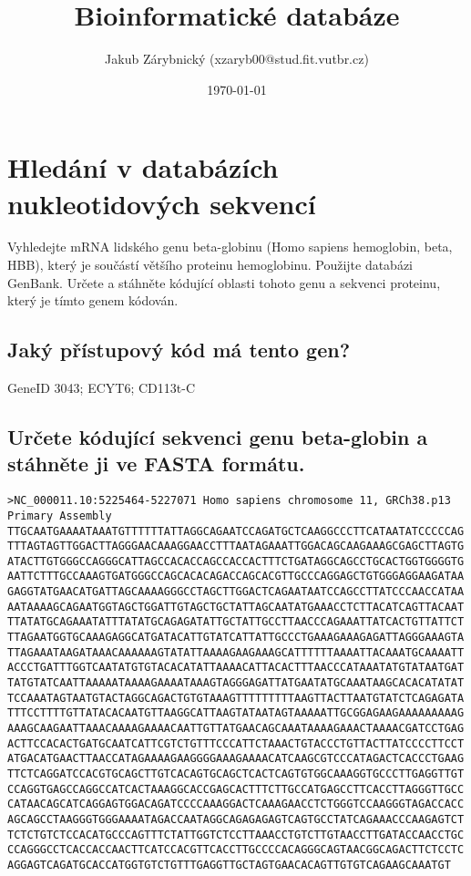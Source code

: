 \documentclass[11pt]{article}
\author{Jakub Zárybnický (xzaryb00@stud.fit.vutbr.cz)}
\date{\today}
\title{Bioinformatické databáze}
\begin{document}
\maketitle
\tableofcontents



\section{Hledání v databázích nukleotidových sekvencí}
\label{sec:org0b3b90d}
Vyhledejte mRNA lidského genu beta-globinu (Homo sapiens hemoglobin, beta, HBB), který je součástí většího proteinu hemoglobinu. Použijte databázi GenBank. Určete a stáhněte kódující oblasti tohoto genu a sekvenci proteinu, který je tímto genem kódován.

\subsection{Jaký přístupový kód má tento gen?}
\label{sec:org195fec5}
GeneID 3043; ECYT6; CD113t-C
\subsection{Určete kódující sekvenci genu beta-globin a stáhněte ji ve FASTA formátu.}
\label{sec:org1ab9ad1}
\begin{verbatim}
>NC_000011.10:5225464-5227071 Homo sapiens chromosome 11, GRCh38.p13 Primary Assembly
TTGCAATGAAAATAAATGTTTTTTATTAGGCAGAATCCAGATGCTCAAGGCCCTTCATAATATCCCCCAG
TTTAGTAGTTGGACTTAGGGAACAAAGGAACCTTTAATAGAAATTGGACAGCAAGAAAGCGAGCTTAGTG
ATACTTGTGGGCCAGGGCATTAGCCACACCAGCCACCACTTTCTGATAGGCAGCCTGCACTGGTGGGGTG
AATTCTTTGCCAAAGTGATGGGCCAGCACACAGACCAGCACGTTGCCCAGGAGCTGTGGGAGGAAGATAA
GAGGTATGAACATGATTAGCAAAAGGGCCTAGCTTGGACTCAGAATAATCCAGCCTTATCCCAACCATAA
AATAAAAGCAGAATGGTAGCTGGATTGTAGCTGCTATTAGCAATATGAAACCTCTTACATCAGTTACAAT
TTATATGCAGAAATATTTATATGCAGAGATATTGCTATTGCCTTAACCCAGAAATTATCACTGTTATTCT
TTAGAATGGTGCAAAGAGGCATGATACATTGTATCATTATTGCCCTGAAAGAAAGAGATTAGGGAAAGTA
TTAGAAATAAGATAAACAAAAAAGTATATTAAAAGAAGAAAGCATTTTTTAAAATTACAAATGCAAAATT
ACCCTGATTTGGTCAATATGTGTACACATATTAAAACATTACACTTTAACCCATAAATATGTATAATGAT
TATGTATCAATTAAAAATAAAAGAAAATAAAGTAGGGAGATTATGAATATGCAAATAAGCACACATATAT
TCCAAATAGTAATGTACTAGGCAGACTGTGTAAAGTTTTTTTTTAAGTTACTTAATGTATCTCAGAGATA
TTTCCTTTTGTTATACACAATGTTAAGGCATTAAGTATAATAGTAAAAATTGCGGAGAAGAAAAAAAAAG
AAAGCAAGAATTAAACAAAAGAAAACAATTGTTATGAACAGCAAATAAAAGAAACTAAAACGATCCTGAG
ACTTCCACACTGATGCAATCATTCGTCTGTTTCCCATTCTAAACTGTACCCTGTTACTTATCCCCTTCCT
ATGACATGAACTTAACCATAGAAAAGAAGGGGAAAGAAAACATCAAGCGTCCCATAGACTCACCCTGAAG
TTCTCAGGATCCACGTGCAGCTTGTCACAGTGCAGCTCACTCAGTGTGGCAAAGGTGCCCTTGAGGTTGT
CCAGGTGAGCCAGGCCATCACTAAAGGCACCGAGCACTTTCTTGCCATGAGCCTTCACCTTAGGGTTGCC
CATAACAGCATCAGGAGTGGACAGATCCCCAAAGGACTCAAAGAACCTCTGGGTCCAAGGGTAGACCACC
AGCAGCCTAAGGGTGGGAAAATAGACCAATAGGCAGAGAGAGTCAGTGCCTATCAGAAACCCAAGAGTCT
TCTCTGTCTCCACATGCCCAGTTTCTATTGGTCTCCTTAAACCTGTCTTGTAACCTTGATACCAACCTGC
CCAGGGCCTCACCACCAACTTCATCCACGTTCACCTTGCCCCACAGGGCAGTAACGGCAGACTTCTCCTC
AGGAGTCAGATGCACCATGGTGTCTGTTTGAGGTTGCTAGTGAACACAGTTGTGTCAGAAGCAAATGT
\end{verbatim}
\end{document}
